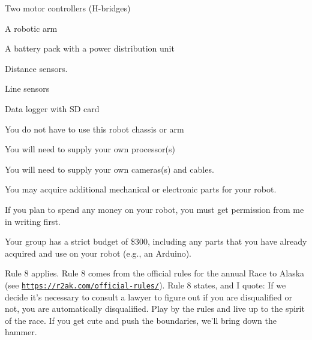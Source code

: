 \begin{DoxyItemize}
\begin{DoxyItemize}
\begin{DoxyItemize}
\item Two motor controllers (H-\/bridges)
\item A robotic arm
\item A battery pack with a power distribution unit
\item Distance sensors.
\item Line sensors
\item Data logger with SD card
\end{DoxyItemize}
\item You do not have to use this robot chassis or arm
\item You will need to supply your own processor(s)
\item You will need to supply your own cameras(s) and cables.
\item You may acquire additional mechanical or electronic parts for your robot.
\item If you plan to spend any money on your robot, you must get permission from me in writing first.
\item Your group has a strict budget of \$300, including any parts that you have already acquired and use on your robot (e.\+g., an Arduino).
\end{DoxyItemize}
\item Rule 8 applies. Rule 8 comes from the official rules for the annual Race to Alaska (see \href{https://r2ak.com/official-rules/}{\tt https\+://r2ak.\+com/official-\/rules/}). Rule 8 states, and I quote\+: If we decide it’s necessary to consult a lawyer to figure out if you are disqualified or not, you are automatically disqualified. Play by the rules and live up to the spirit of the race. If you get cute and push the boundaries, we’ll bring down the hammer. 
\end{DoxyItemize}